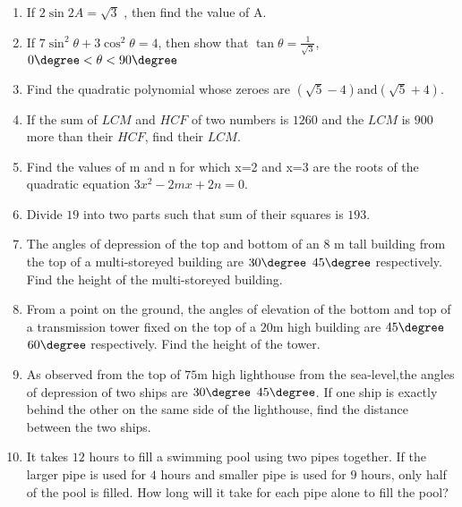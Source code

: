 \documentclass[20pt,-letter paper]{article}
\begin{document}
\begin{enumerate}
\item If $2\sin 2A=\sqrt{3}$ , then find the value of A.

\item If $7\sin^2\theta + 3\cos^2\theta = 4$, then show that $\tan\theta= \frac{1}{\sqrt{3}}$, $0\degree <\theta < 90\degree$

\item Find the quadratic polynomial whose zeroes are $(\sqrt{5}-4) \text{and}(\sqrt{5}+4)$.

\item If the sum of $LCM$ and $HCF$ of two numbers is $1260$ and the $LCM$ is $900$ more than their $HCF$, find their $LCM$.

\item Find the values of m and n for which x=2 and x=3 are the roots of the quadratic equation $3x^2-2mx+2n=0$.

 \item Divide $19$ into two parts such that sum of their squares is $193$.

\item The angles of depression of the top and bottom of an $8$ m tall building from the top of a multi-storeyed building are $30\degree$  $45\degree$ respectively. Find the height of the multi-storeyed building.

\item From a point on the ground, the angles of elevation of the bottom and top of a transmission tower fixed on the top of a $20$m high building are $45\degree$  $60\degree$ respectively. Find the height of the tower.

 \item As observed from the top of $75$m high lighthouse from the sea-level,the angles of depression of two ships are $30\degree$   $45\degree$. If one ship is exactly behind the other on the same side of the lighthouse, find the distance between the two ships.

\item It takes $12$ hours to fill a swimming pool using two pipes together. If the larger pipe is used for $4$ hours and smaller pipe is used for $9$ hours, only half of the pool is filled. How long will it take for each pipe alone to fill the  pool? 

\end{enumerate}
\end{document}
